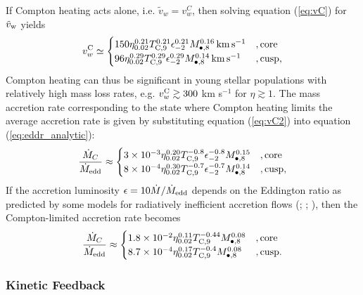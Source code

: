 \documentclass[usenatbib,fleqn]{mn2e}
\begin{document}
If Compton heating acts alone, i.e. $\tilde{v}_{w} = v_{w}^{C}$, then solving equation
(\ref{eq:vC}) for $\tilde{v}_{\rm w}$ yields
\begin{align} v_{w}^{\rm C} \simeq
  \begin{cases} 150 \eta_{0.02}^{0.21}T_{\rm
C,9}^{0.21}\epsilon_{-2}^{0.21} M_{\bullet,8}^{0.16}\,{\rm km\,s^{-1}}
&, \text{core}\\ 96 \eta_{0.02}^{0.29}T_{\rm
C,9}^{0.29}\epsilon_{-2}^{0.29} M_{\bullet,8}^{0.14}\,{\rm km\,s^{-1}}
&, \text{cusp},
  \end{cases}
  \label{eq:vC2}
\end{align} 
Compton heating can thus be significant in young stellar populations with relatively high mass loss rates, e.g. $v_{w}^{\rm C} \gtrsim 300$ km s$^{-1}$ for $\eta \gtrsim 1$.  The mass accretion rate corresponding to the state where Compton heating limits the average accretion rate is given by substituting equation (\ref{eq:vC2}) into equation (\ref{eq:eddr_analytic}):
\begin{align}
\frac{\dot{M}_{C}}{\dot{M}_{\rm edd}} \approx 
\begin{cases} 3\times 10^{-3} \eta_{0.02}^{0.20}T_{\rm
C,9}^{-0.8}\epsilon_{-2}^{-0.8} M_{\bullet,8}^{0.15}
&, \text{core}\\ 8\times 10^{-4} \eta_{0.02}^{0.30}T_{\rm
C,9}^{-0.7}\epsilon_{-2}^{-0.7} M_{\bullet,8}^{0.14}
&, \text{cusp},
  \end{cases}
  \label{eq:MdotCa}
\end{align}
If the accretion luminosity $\epsilon = 10 \dot{M}/\dot{M}_{\rm edd}$
depends on the Eddington ratio as predicted by some models for
radiatively inefficient accretion flows (\citealt{Narayan&Yi95};
\citealt{Narayan+98}; \citealt{XieYuan:2012a}), then the Compton-limited accretion rate becomes
\begin{align}
\frac{\dot{M}_{C}}{\dot{M}_{\rm edd}} \approx 
\begin{cases} 1.8\times 10^{-2} \eta_{0.02}^{0.11}T_{\rm
C,9}^{-0.44}M_{\bullet,8}^{0.08}
&, \text{core}\\ 8.7\times 10^{-4} \eta_{0.02}^{0.17}T_{\rm
C,9}^{-0.4} M_{\bullet,8}^{0.08}
&, \text{cusp}.
  \end{cases}
  \label{eq:MdotC}
\end{align}


\subsubsection{Kinetic Feedback}
\end{document}
